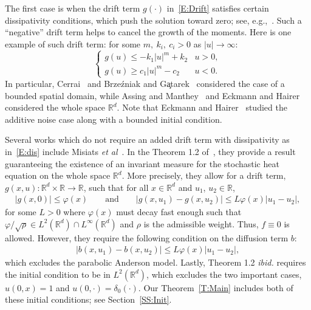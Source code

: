 \documentclass[sn-mathphys]{sn-jnl}%
\newcommand{\BR}{\mathbb{R}}
\numberwithin{equation}{section}
\theoremstyle{thmstyleone}%
\theoremstyle{thmstyletwo}%
\theoremstyle{thmstylethree}%
\begin{document}
The first case is when the drift term $g(\cdot)$ in~\eqref{E:Drift} satisfies certain dissipativity
conditions, which push the solution toward zero; see, e.g.,~\cite{assing.manthey:03:invariant,
brzezniak.gatarek:99:martingale, cerrai:01:second, cerrai:03:stochastic,
eckmann.hairer:01:invariant}. Such a ``negative'' drift term helps to cancel the growth of the
moments. Here is one example of such drift term: for some $m,\: k_i, \: c_i>0$ as $\lvert u \rvert \to \infty$:
\begin{equation}\label{E:dis}
  \begin{cases}
    g(u) \le -k_1\lvert u \rvert^m + k_2 & u > 0, \\
    g(u) \ge c_1\lvert u \rvert^m - c_2  & u < 0.
  \end{cases}
\end{equation}
In particular, Cerrai~\cite{cerrai:01:second, cerrai:03:stochastic} and Brze\'{z}niak and
G\c{a}tarek~\cite{brzezniak.gatarek:99:martingale} considered the case of a bounded spatial domain,
while Assing and Manthey~\cite{assing.manthey:03:invariant} and Eckmann and
Hairer~\cite{eckmann.hairer:01:invariant} considered the whole space $\BR^d$. Note that Eckmann and
Hairer~\cite{eckmann.hairer:01:invariant} studied the additive noise case along with a bounded
initial condition.

Several works which do not require an added drift term with dissipativity as in~\eqref{E:dis}
include Misiats \textit{et
al}~\cite{misiats.stanzhytskyi.ea:16:existence,misiats.stanzhytskyi.ea:20:invariant}. In the Theorem
1.2 of~\cite{misiats.stanzhytskyi.ea:20:invariant}, they provide a result guaranteeing the existence
of an invariant measure for the stochastic heat equation on the whole space $\BR^d$. More precisely,
they allow for a drift term, $g(x,u):\BR^d \times \BR \to \BR$, such that for all $x \in \BR^d$ and
$u_1$, $u_2 \in \BR$,
\begin{align*}
		\lvert g(x,0) \rvert \le \varphi(x) \qquad \text{and} \qquad
    \lvert g(x,u_1) - g(x,u_2) \rvert \le L\varphi(x) \lvert u_1 - u_2 \rvert,
\end{align*}
for some $L>0$ where $\varphi(x)$ must decay fast enough such that $\varphi / \sqrt{\rho} \in
L^2 (\BR^d) \cap L^{\infty}(\BR^d)$ and $\rho$ is the admissible weight. Thus, $f \equiv 0$ is allowed.
However, they require the following condition on the diffusion term $b$:
\begin{align*}
  \lvert b(x,u_1) - b(x,u_2)\rvert \le L\varphi(x) \lvert u_1 - u_2 \rvert,
\end{align*}
which excludes the parabolic Anderson model. Lastly, Theorem 1.2 \textit{ibid.} requires the initial
condition to be in $L^2 (\BR^d)$, which excludes the two important cases, $u(0,x) = 1$ and
$u(0,\cdot) = \delta_0(\cdot)$. Our Theorem~\ref{T:Main} includes both of these initial conditions;
see Section~\ref{SS:Init}.
\end{document}
